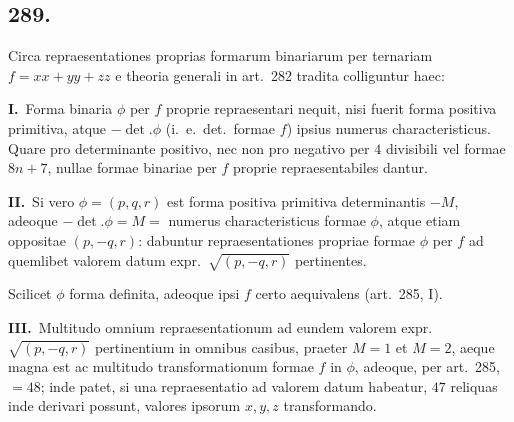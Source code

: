 \documentclass[12pt,a4paper]{article}
\theoremstyle{plain}
\theoremstyle{definition}
\theoremstyle{remark}
\begin{document}
\subsection*{289.}

Circa repraesentationes proprias formarum binariarum per ternariam $f = xx + yy + zz$ e theoria generali in art.\ 282 tradita colliguntur haec:

\textbf{I.}\ Forma binaria $\phi$ per $f$ proprie repraesentari nequit, nisi fuerit forma positiva primitiva, atque $-\det.\phi$ (i.\ e.\ det.\ formae $f$) ipsius numerus characteristicus. Quare pro determinante positivo, nec non pro negativo per $4$ divisibili vel formae $8n + 7$, nullae formae binariae per $f$ proprie repraesentabiles dantur.

\textbf{II.}\ Si vero $\phi = (p, q, r)$ est forma positiva primitiva determinantis $-M$, adeoque $-\det.\phi = M = $ numerus characteristicus formae $\phi$, atque etiam oppositae $(p, -q, r)$: dabuntur repraesentationes propriae formae $\phi$ per $f$ ad quemlibet valorem datum expr.\ $\sqrt{(p, -q, r)}$ pertinentes.

Scilicet $\phi$ forma definita, adeoque ipsi $f$ certo aequivalens (art.\ 285, I).

\textbf{III.}\ Multitudo omnium repraesentationum ad eundem valorem expr.\ $\sqrt{(p, -q, r)}$ pertinentium in omnibus casibus, praeter $M = 1$ et $M = 2$, aeque magna est ac multitudo transformationum formae $f$ in $\phi$, adeoque, per art.\ 285, $= 48$; inde patet, si una repraesentatio ad valorem datum habeatur, $47$ reliquas inde derivari possunt, valores ipsorum $x, y, z$ transformando.
\end{document}
